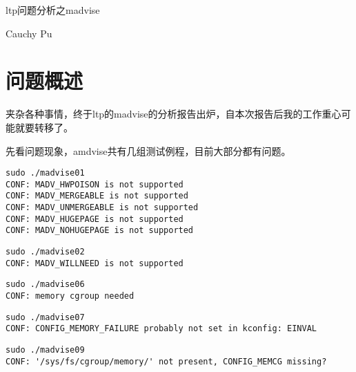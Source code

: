 \documentclass[scheme=plain]{ctexart}
\begin{document}

{}
\begin{center}
  \begin{Huge}
    ltp问题分析之madvise
  \end{Huge}
\end{center}

\begin{center}
  \begin{huge}
    Cauchy Pu
  \end{huge}
\end{center}

\section{问题概述}
\label{sec:wtgs}
夹杂各种事情，终于ltp的madvise的分析报告出炉，自本次报告后我的工作重心可能就要转移了。

先看问题现象，amdvise共有几组测试例程，目前大部分都有问题。
\begin{verbatim}
sudo ./madvise01
CONF: MADV_HWPOISON is not supported
CONF: MADV_MERGEABLE is not supported
CONF: MADV_UNMERGEABLE is not supported
CONF: MADV_HUGEPAGE is not supported
CONF: MADV_NOHUGEPAGE is not supported
\end{verbatim}

\begin{verbatim}
sudo ./madvise02
CONF: MADV_WILLNEED is not supported
\end{verbatim}

\begin{verbatim}
sudo ./madvise06
CONF: memory cgroup needed
\end{verbatim}

\begin{verbatim}
sudo ./madvise07
CONF: CONFIG_MEMORY_FAILURE probably not set in kconfig: EINVAL
\end{verbatim}

\begin{verbatim}
sudo ./madvise09
CONF: '/sys/fs/cgroup/memory/' not present, CONFIG_MEMCG missing?
\end{verbatim}
\end{document}
